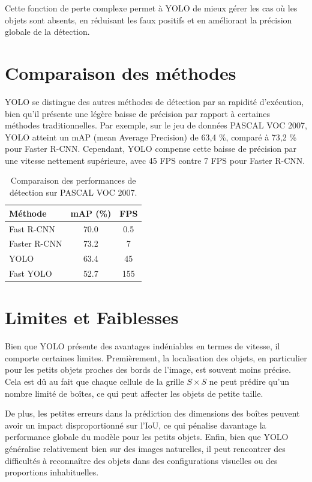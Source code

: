 \documentclass[a4paper,11pt]{article}
\begin{document}
Cette fonction de perte complexe permet à YOLO de mieux gérer les cas où les objets sont absents, en réduisant les faux positifs et en améliorant la précision globale de la détection.

\section{Comparaison des méthodes}

\indent YOLO se distingue des autres méthodes de détection par sa rapidité d'exécution, bien qu'il présente une légère baisse de précision par rapport à certaines méthodes traditionnelles. Par exemple, sur le jeu de données PASCAL VOC 2007, YOLO atteint un mAP (mean Average Precision) de 63,4 \%, comparé à 73,2 \% pour Faster R-CNN. Cependant, YOLO compense cette baisse de précision par une vitesse nettement supérieure, avec 45 FPS contre 7 FPS pour Faster R-CNN.

\begin{table}[h]
\centering
\begin{tabular}{lcc}
\toprule
\textbf{Méthode} & \textbf{mAP (\%)} & \textbf{FPS} \\
\midrule
Fast R-CNN & 70.0 & 0.5 \\
Faster R-CNN & 73.2 & 7 \\
YOLO & 63.4 & 45 \\
Fast YOLO & 52.7 & 155 \\
\bottomrule
\end{tabular}
\caption{Comparaison des performances de détection sur PASCAL VOC 2007.}
\end{table}

\section{Limites et Faiblesses}

\indent Bien que YOLO présente des avantages indéniables en termes de vitesse, il comporte certaines limites. Premièrement, la localisation des objets, en particulier pour les petits objets proches des bords de l’image, est souvent moins précise. Cela est dû au fait que chaque cellule de la grille $S \times S$ ne peut prédire qu’un nombre limité de boîtes, ce qui peut affecter les objets de petite taille.

De plus, les petites erreurs dans la prédiction des dimensions des boîtes peuvent avoir un impact disproportionné sur l'IoU, ce qui pénalise davantage la performance globale du modèle pour les petits objets. Enfin, bien que YOLO généralise relativement bien sur des images naturelles, il peut rencontrer des difficultés à reconnaître des objets dans des configurations visuelles ou des proportions inhabituelles.
\end{document}
